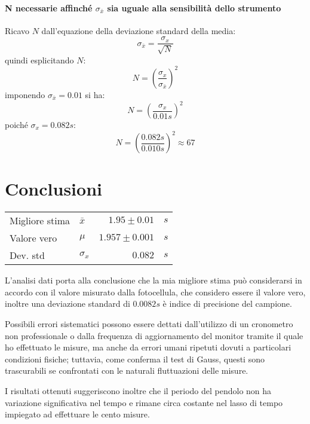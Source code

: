 \documentclass{article}
\begin{document}
	\noindent
	\paragraph{N necessarie affinché $\sigma_{\bar{x}}$ sia uguale alla sensibilità dello strumento}
	Ricavo $N$ dall'equazione della deviazione standard della media:
	\[
	\sigma_{\bar{x}} = \frac{\sigma_{x}}{\sqrt{N}} 
	\]
	quindi esplicitando $N$:
	\[
	N = \left(\frac{\sigma_x}{\sigma_{\bar{x}}}\right)^2
	\]
	imponendo $\sigma_{\bar{x}} = 0.01$ si ha:
	\[
	N = \left(\frac{\sigma_x}{0.01s}\right)^2
	\]
	poiché $\sigma_x = 0.082s$:
	\[
	N = \left(\frac{0.082s}{0.010s}\right)^2 \approx 67
	\]
	
	
	
\vspace{1.2cm}
	\section{Conclusioni}
	\textcolor{white}{ }
	
	\begin{minipage}[c]{1\textwidth}
	\centering
	\begin{tabular}{llrl}
		Migliore stima           & $\bar{x}$             & $1.95 \pm 0.01$        & $s$       \\
		Valore vero  & $\mu$ & $1.957 \pm 0.001$  & $s$ \\
		Dev. std                    & $\sigma_{x}$              & $0.082$      & $s$   \\
	\end{tabular}
	\end{minipage}
	\vspace{0.1cm}
	
	\noindent
	L'analisi dati porta alla conclusione che la mia migliore stima può considerarsi in accordo con il valore misurato dalla fotocellula, che considero essere il valore vero, inoltre una deviazione standard di $0.0082s$ è indice di precisione del campione. 
	
	Possibili errori sistematici possono essere dettati dall'utilizzo di un cronometro non professionale o dalla frequenza di aggiornamento del monitor tramite il quale ho effettuato le misure, ma anche da errori umani ripetuti dovuti a particolari condizioni fisiche; tuttavia, come conferma il test di Gauss, questi sono trascurabili se confrontati con le naturali fluttuazioni delle misure. 
	
	 I risultati ottenuti suggeriscono inoltre che il periodo del pendolo non ha variazione significativa nel tempo e rimane circa costante nel lasso di tempo impiegato ad effettuare le cento misure. 
	
\end{document}
